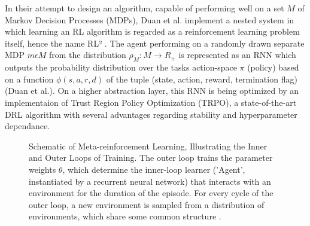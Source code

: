 \documentclass[letterpaper, 10 pt, conference]{ieeeconf}  %
\begin{document}
In their attempt to design an algorithm, capable of performing well on a set $M$ of Markov Decision Processes (MDPs), Duan et al. implement a nested
system in which learning an RL algorithm is regarded as a reinforcement learning problem itself, hence the name RL² 
\cite{duanRLFastReinforcement2016}. The agent performing 
on a randomly drawn separate MDP $m \epsilon M$ from the distribution $\rho_{M} : M \longrightarrow R_{+}$ is represented as an RNN
which outputs the probability distribution over the tasks action-space $\pi$ (policy) based on a function $\phi (s,a,r,d)$ of 
the tuple (state, action, reward, termination flag) (Duan et al.). On a higher abstraction layer, this RNN is being 
optimized by an implementaion of Trust Region Policy Optimization (TRPO), a 
state-of-the-art DRL algorithm \cite{schulmanTrustRegionPolicy2015} with several advantages regarding stability
 and hyperparameter dependance.\newline

\begin{figure}[thpb]
        \centering
  \caption{Schematic of Meta-reinforcement Learning, Illustrating the Inner and Outer Loops of Training. The
  outer loop trains the parameter weights $\theta$, which determine the inner-loop learner (’Agent’, instantiated by a recurrent
  neural network) that interacts with an environment for the duration of the episode. For every cycle of the outer loop, a new
  environment is sampled from a distribution of environments, which share some common structure \cite{botvinickReinforcementLearningFast2019}.}
        \label{figurelabel}
     \end{figure}
\end{document}
